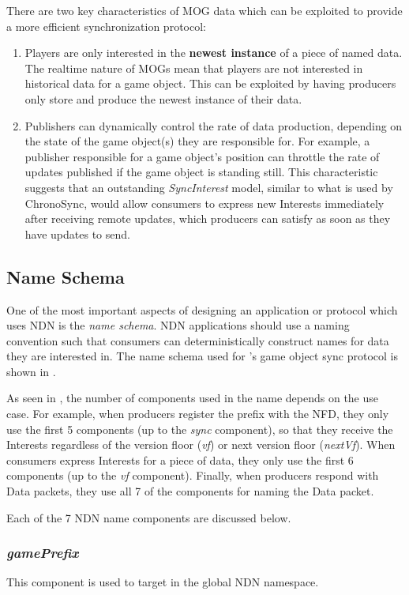 There are two key characteristics of MOG data which can be exploited to provide a more efficient synchronization protocol:
\begin{enumerate}
    \item Players are only interested in the \textbf{newest instance} of a piece of named data. The realtime nature of MOGs mean that players are not interested in historical data for a game object. This can be exploited by having producers only store and produce the newest instance of their data.
    \item Publishers can dynamically control the rate of data production, depending on the state of the game object(s) they are responsible for. For example, a publisher responsible for a game object's position can throttle the rate of updates published if the game object is standing still. This characteristic suggests that an outstanding \textit{SyncInterest} model, similar to what is used by ChronoSync, would allow consumers to express new Interests immediately after receiving remote updates, which producers can satisfy as soon as they have updates to send.
\end{enumerate}

\subsection{Name Schema}\label{sec:des:naming}
One of the most important aspects of designing an application or protocol which uses NDN is the \textit{name schema}. NDN applications should use a naming convention such that consumers can deterministically construct names for data they are interested in. The name schema used for \game{}'s game object sync protocol is shown in .


As seen in , the number of components used in the name depends on the use case. For example, when producers register the prefix with the NFD, they only use the first 5 components (up to the \textit{sync} component), so that they receive the Interests regardless of the version floor (\textit{vf}) or next version floor (\textit{nextVf}). When consumers express Interests for a piece of data, they only use the first 6 components (up to the \textit{vf} component). Finally, when producers respond with Data packets, they use all 7 of the components for naming the Data packet.

Each of the 7 NDN name components are discussed below.

\subsubsection{\textit{gamePrefix}}
This component is used to target \game{} in the global NDN namespace.

